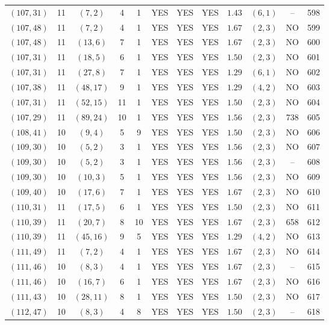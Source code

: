 \begin{longtable}{|c|c|c|c|c|c|c|c|c|c|c|c|}
$(107,31)$ & 11 & $(7,2)$ & 4 & 1 & YES & YES & YES & $1.43$ & $(6,1)$ & -- & 598\\
$(107,48)$ & 11 & $(7,2)$ & 4 & 1 & YES & YES & YES & $1.67$ & $(2,3)$ & NO & 599\\
$(107,48)$ & 11 & $(13,6)$ & 7 & 1 & YES & YES & YES & $1.67$ & $(2,3)$ & NO & 600\\
$(107,31)$ & 11 & $(18,5)$ & 6 & 1 & YES & YES & YES & $1.50$ & $(2,3)$ & NO & 601\\
$(107,31)$ & 11 & $(27,8)$ & 7 & 1 & YES & YES & YES & $1.29$ & $(6,1)$ & NO & 602\\
$(107,38)$ & 11 & $(48,17)$ & 9 & 1 & YES & YES & YES & $1.29$ & $(4,2)$ & NO & 603\\
$(107,31)$ & 11 & $(52,15)$ & 11 & 1 & YES & YES & YES & $1.50$ & $(2,3)$ & NO & 604\\
$(107,29)$ & 11 & $(89,24)$ & 10 & 1 & YES & YES & YES & $1.56$ & $(2,3)$ & 738 & 605\\
$(108,41)$ & 10 & $(9,4)$ & 5 & 9 & YES & YES & YES & $1.50$ & $(2,3)$ & NO & 606\\
$(109,30)$ & 10 & $(5,2)$ & 3 & 1 & YES & YES & YES & $1.56$ & $(2,3)$ & NO & 607\\
$(109,30)$ & 10 & $(5,2)$ & 3 & 1 & YES & YES & YES & $1.56$ & $(2,3)$ & -- & 608\\
$(109,30)$ & 10 & $(10,3)$ & 5 & 1 & YES & YES & YES & $1.56$ & $(2,3)$ & NO & 609\\
$(109,40)$ & 10 & $(17,6)$ & 7 & 1 & YES & YES & YES & $1.67$ & $(2,3)$ & NO & 610\\
$(110,31)$ & 11 & $(17,5)$ & 6 & 1 & YES & YES & YES & $1.50$ & $(2,3)$ & NO & 611\\
$(110,39)$ & 11 & $(20,7)$ & 8 & 10 & YES & YES & YES & $1.67$ & $(2,3)$ & 658 & 612\\
$(110,39)$ & 11 & $(45,16)$ & 9 & 5 & YES & YES & YES & $1.29$ & $(4,2)$ & NO & 613\\
$(111,49)$ & 11 & $(7,2)$ & 4 & 1 & YES & YES & YES & $1.67$ & $(2,3)$ & NO & 614\\
$(111,46)$ & 10 & $(8,3)$ & 4 & 1 & YES & YES & YES & $1.67$ & $(2,3)$ & -- & 615\\
$(111,46)$ & 10 & $(16,7)$ & 6 & 1 & YES & YES & YES & $1.67$ & $(2,3)$ & NO & 616\\
$(111,43)$ & 10 & $(28,11)$ & 8 & 1 & YES & YES & YES & $1.50$ & $(2,3)$ & NO & 617\\
$(112,47)$ & 10 & $(8,3)$ & 4 & 8 & YES & YES & YES & $1.50$ & $(2,3)$ & -- & 618\\

\end{longtable}

